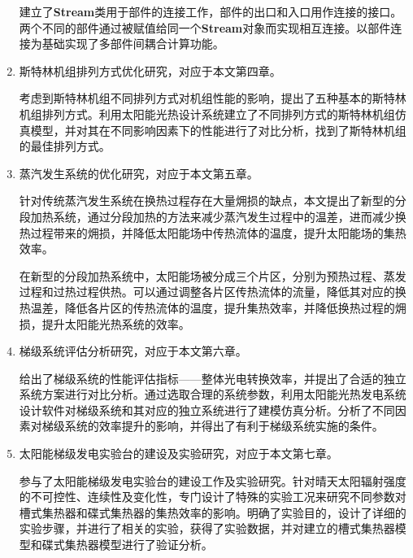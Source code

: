 \begin{enumerate}[label=(\arabic*)]
	建立了\textbf{Stream}类用于部件的连接工作，部件的出口和入口用作连接的接口。两个不同的部件通过被赋值给同一个\textbf{Stream}对象而实现相互连接。以部件连接为基础实现了多部件间耦合计算功能。

	\item 斯特林机组排列方式优化研究，对应于本文第四章。
	
	考虑到斯特林机组不同排列方式对机组性能的影响，提出了五种基本的斯特林机组排列方式。利用太阳能光热设计系统建立了不同排列方式的斯特林机组仿真模型，并对其在不同影响因素下的性能进行了对比分析，找到了斯特林机组的最佳排列方式。

	\item 蒸汽发生系统的优化研究，对应于本文第五章。
	
	针对传统蒸汽发生系统在换热过程存在大量㶲损的缺点，本文提出了新型的分段加热系统，通过分段加热的方法来减少蒸汽发生过程中的温差，进而减少换热过程带来的㶲损，并降低太阳能场中传热流体的温度，提升太阳能场的集热效率。
	
	在新型的分段加热系统中，太阳能场被分成三个片区，分别为预热过程、蒸发过程和过热过程供热。可以通过调整各片区传热流体的流量，降低其对应的换热温差，降低各片区的传热流体的温度，提升集热效率，并降低换热过程的㶲损，提升太阳能光热系统的效率。

	\item 梯级系统评估分析研究，对应于本文第六章。
	
	给出了梯级系统的性能评估指标——整体光电转换效率，并提出了合适的独立系统方案进行对比分析。通过选取合理的系统参数，利用太阳能光热发电系统设计软件对梯级系统和其对应的独立系统进行了建模仿真分析。分析了不同因素对梯级系统的效率提升的影响，并得出了有利于梯级系统实施的条件。

	\item 太阳能梯级发电实验台的建设及实验研究，对应于本文第七章。
	
	参与了太阳能梯级发电实验台的建设工作及实验研究。针对晴天太阳辐射强度的不可控性、连续性及变化性，专门设计了特殊的实验工况来研究不同参数对槽式集热器和碟式集热器的集热效率的影响。明确了实验目的，设计了详细的实验步骤，并进行了相关的实验，获得了实验数据，并对建立的槽式集热器模型和碟式集热器模型进行了验证分析。
\end{enumerate}

